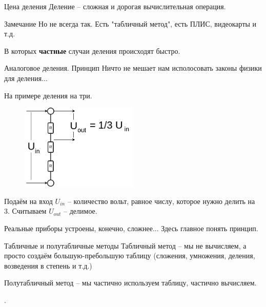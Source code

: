 \begin{frame}{Цена деления}
Деление -- сложная и дорогая вычислительная операция.
	
	\begin{block}{Замечание}
	Но не всегда так. 
	Есть "табличный метод",
	есть ПЛИС, видеокарты и т.д.
	
	В которых \textbf{частные} случаи деления происходят быстро.
	\end{block}

\end{frame}

\begin{frame}{Аналоговое деления. Принцип}
	\small
 	Ничто не мешает нам исполосовать законы физики для деления...
 	
 	На примере деления на три.
 	
 	\begin{figure}
 		\centering
 		\includegraphics[width=0.5\textwidth]{./../pic/U_division.drawio.png}
 	\end{figure}
 	Подаём на вход $U_{in}$ -- количество вольт, равное числу, которое нужно делить на 3.
 	Считываем $U_{out}$ -- делимое.
 	
 	Реальные приборы устроены, конечно, сложнее... Здесь главное понять принцип.

	

\end{frame}





\begin{frame}{Табличные и полутабличные методы}
	Табличный метод -- мы не вычисляем, а просто создаём большую-пребольшую таблицу (сложения, умножения, деления, возведения в степень и т.д.)
	
	
	Полутабличный метод -- мы частично используем таблицу, частично вычисляем.
	
	.
\end{frame}


